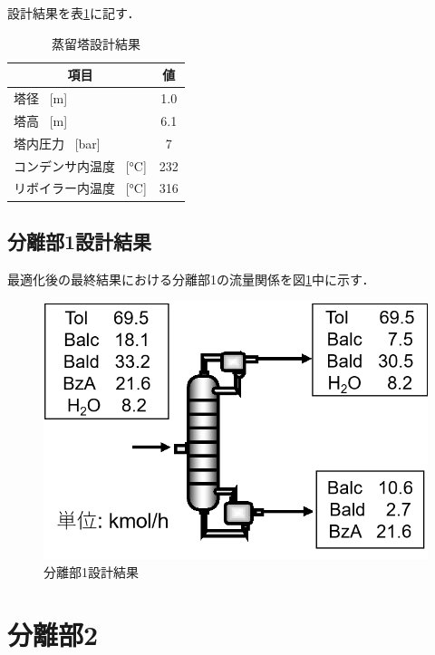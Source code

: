 \documentclass[a4j]{jsreport}
\begin{document}
設計結果を表\ref{蒸留塔設計結果}に記す．
\begin{table}[htbp]
  \label{蒸留塔設計結果}
  \caption{蒸留塔設計結果}
  \centering
  \begin{tabular}{lc}
      \hline
      \multicolumn{1}{c}{項目} & 値 \\
      \hline
      塔径 \, [\si{\metre}] & 1.0 \\
      塔高 \, [\si{\metre}] & 6.1 \\
      塔内圧力 \, [\si{\bar}] &7 \\
      コンデンサ内温度 \, [\si{\degreeCelsius}] & 232 \\
      リボイラー内温度 \, [\si{\degreeCelsius}] & 316 \\
      \hline
  \end{tabular}
\end{table}

\section{分離部1設計結果}
最適化後の最終結果における分離部1の流量関係を図\ref{分離部1設計結果の図}中に示す．
\begin{figure}[htbp]
  \centering
  \includegraphics[scale=0.7]{Separation1Conclusion.png}
  \caption{分離部1設計結果}
  \label{分離部1設計結果の図}
\end{figure}


\newpage
\chapter{分離部2}
\end{document}
